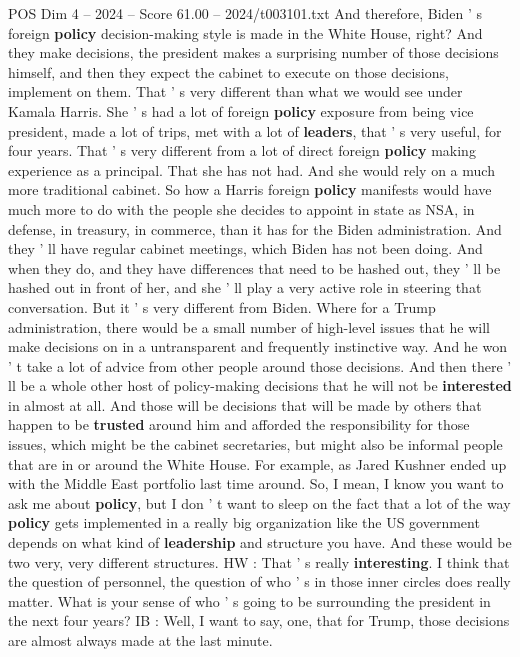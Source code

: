 \begin{textsample}{POS Dim 4 – 2024 – Score 61.00 – 2024/t003101.txt}
And therefore, Biden ' s foreign \textbf{policy} decision-making style is made in the White House, right?
And they make decisions, the president makes a surprising number of those decisions himself, and then they expect the cabinet to execute on those decisions, implement on them.
That ' s very different than what we would see under Kamala Harris.
She ' s had a lot of foreign \textbf{policy} exposure from being vice president, made a lot of trips, met with a lot of \textbf{leaders}, that ' s very useful, for four years.
That ' s very different from a lot of direct foreign \textbf{policy} making experience as a principal.
That she has not had.
And she would rely on a much more traditional cabinet.
So how a Harris foreign \textbf{policy} manifests would have much more to do with the people she decides to appoint in state as NSA, in defense, in treasury, in commerce, than it has for the Biden administration.
And they ' ll have regular cabinet meetings, which Biden has not been doing.
And when they do, and they have differences that need to be hashed out, they ' ll be hashed out in front of her, and she ' ll play a very active role in steering that conversation.
But it ' s very different from Biden.
Where for a Trump administration, there would be a small number of high-level issues that he will make decisions on in a untransparent and frequently instinctive way.
And he won ' t take a lot of advice from other people around those decisions.
And then there ' ll be a whole other host of policy-making decisions that he will not be \textbf{interested} in almost at all.
And those will be decisions that will be made by others that happen to be \textbf{trusted} around him and afforded the responsibility for those issues, which might be the cabinet secretaries, but might also be informal people that are in or around the White House.
For example, as Jared Kushner ended up with the Middle East portfolio last time around.
So, I mean, I know you want to ask me about \textbf{policy}, but I don ' t want to sleep on the fact that a lot of the way \textbf{policy} gets implemented in a really big organization like the US government depends on what kind of \textbf{leadership} and structure you have.
And these would be two very, very different structures.
HW : That ' s really \textbf{interesting}.
I think that the question of personnel, the question of who ' s in those inner circles does really matter.
What is your sense of who ' s going to be surrounding the president in the next four years?
IB : Well, I want to say, one, that for Trump, those decisions are almost always made at the last minute.

\end{textsample}
